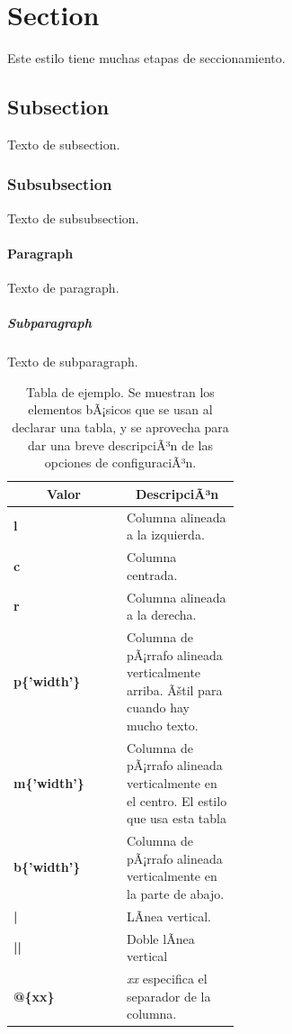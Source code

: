 \documentclass[11pt,spanish]{report}
\begin{document}
\section{Section}

Este estilo tiene muchas etapas de seccionamiento.

\subsection{Subsection}

Texto de subsection.

\subsubsection{Subsubsection}

Texto de subsubsection.

\paragraph{Paragraph}

Texto de paragraph.

\subparagraph{Subparagraph}

Texto de subparagraph.

\begin{table}
\centering
\caption[Tabla de ejemplo]{Tabla de ejemplo. Se muestran los elementos bÃ¡sicos que se usan al declarar una tabla, y se aprovecha para dar una breve descripciÃ³n de las opciones de configuraciÃ³n.}
\label{tab:tabla_ejemplo}
\renewcommand{\arraystretch}{1.3}%
\begin{tabular}{lm{0.5\linewidth}} \toprule
\multicolumn{1}{c}{\textbf{Valor}} & \multicolumn{1}{c}{\textbf{DescripciÃ³n}} \\ \midrule
\textbf{l} & Columna alineada a la izquierda. \\
\textbf{c} & Columna centrada. \\
\textbf{r} & Columna alineada a la derecha. \\
\textbf{p\{'width'\}} & Columna de pÃ¡rrafo alineada verticalmente arriba. Ãštil para cuando hay mucho texto. \\
\textbf{m\{'width'\}} & Columna de pÃ¡rrafo alineada verticalmente en el centro. El estilo que usa esta tabla\\
\textbf{b\{'width'\}} & Columna de pÃ¡rrafo alineada verticalmente en la parte de abajo. \\
\textbf{|} & LÃ­nea vertical. \\
\textbf{||} & Doble lÃ­nea vertical \\
\textbf{@\{xx\}} & \emph{xx} especifica el separador de la columna. \\ \bottomrule
\end{tabular}
\end{table}
\end{document}

